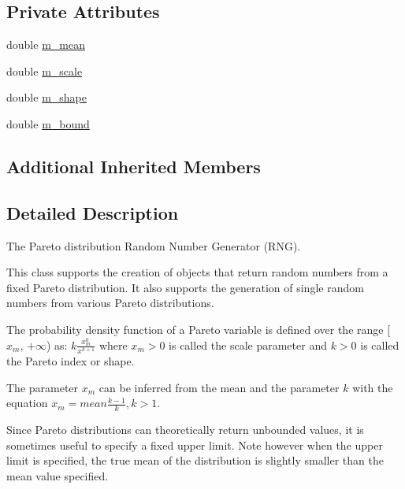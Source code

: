 \subsection*{Private Attributes}
\begin{DoxyCompactItemize}
\item 
double \hyperlink{classns3_1_1ParetoRandomVariable_a6d245bceabbb307777a942674433ee39}{m\+\_\+mean}
\item 
double \hyperlink{classns3_1_1ParetoRandomVariable_a2c52677237cc9bce3c01ea0052444d81}{m\+\_\+scale}
\item 
double \hyperlink{classns3_1_1ParetoRandomVariable_a606ababe260201098981f88c30fa8b39}{m\+\_\+shape}
\item 
double \hyperlink{classns3_1_1ParetoRandomVariable_ab9bf62721171d3bc401081cdaa22e1b7}{m\+\_\+bound}
\end{DoxyCompactItemize}
\subsection*{Additional Inherited Members}


\subsection{Detailed Description}
The Pareto distribution Random Number Generator (R\+NG). 

This class supports the creation of objects that return random numbers from a fixed Pareto distribution. It also supports the generation of single random numbers from various Pareto distributions.

The probability density function of a Pareto variable is defined over the range \mbox{[} $x_m$, $+\infty$) as\+: $ k \frac{x_m^k}{x^{k+1}}$ where $x_m > 0$ is called the scale parameter and $ k > 0$ is called the Pareto index or shape.

The parameter $ x_m $ can be inferred from the mean and the parameter $ k $ with the equation $ x_m = mean \frac{k-1}{k}, k > 1$.

Since Pareto distributions can theoretically return unbounded values, it is sometimes useful to specify a fixed upper limit. Note however when the upper limit is specified, the true mean of the distribution is slightly smaller than the mean value specified.

